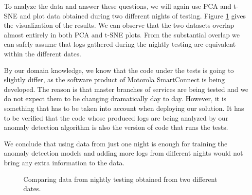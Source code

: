 To analyze the data and answer these questions, we will again use PCA and t-SNE and plot data obtained during two different nights of testing. Figure \ref{fig:tsne-nights-comparison} gives the visualization of the results. We can observe that the two datasets overlap almost entirely in both PCA and t-SNE plots. From the substantial overlap we can safely assume that logs gathered during the nightly testing are equivalent within the different dates.

By our domain knowledge, we know that the code under the tests is going to slightly differ, as the software product of Motorola SmartConnect is being developed. The reason is that master branches of services are being tested and we do not expect them to be changing dramatically day to day. 
However, it is something that has to be taken into account when deploying our solution. It has to be verified that the code whose produced logs are being analyzed by our anomaly detection algorithm is also the version of code that runs the tests.

We conclude that using data from just one night is enough for training the anomaly detection models and adding more logs from different nights would not bring any extra information to the data. 

\begin{figure}%
    \centering
    \qquad
    \caption{Comparing data from nightly testing obtained from two different dates.}%
    \label{fig:tsne-nights-comparison}%
\end{figure}


